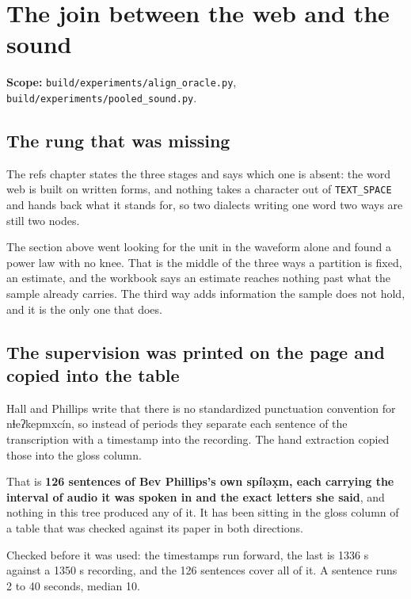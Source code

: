 \section{The join between the web and the sound}

\textbf{Scope:} \texttt{build/\allowbreak{}experiments/\allowbreak{}align\_\allowbreak{}oracle.\allowbreak{}py},
\texttt{build/\allowbreak{}experiments/\allowbreak{}pooled\_\allowbreak{}sound.\allowbreak{}py}.

\subsection{The rung that was missing}

The refs chapter states the three stages and says which one is absent: the word web is built on written
forms, and nothing takes a character out of \texttt{TEXT\_\allowbreak{}SPACE} and hands back what it
stands for, so two dialects writing one word two ways are still two nodes.

The section above went looking for the unit in the waveform alone and found a power law with no knee.
That is the middle of the three ways a partition is fixed, an estimate, and the workbook says an
estimate reaches nothing past what the sample already carries. The third way adds information the
sample does not hold, and it is the only one that does.

\subsection{The supervision was printed on the page and copied into the table}

Hall and Phillips write that there is no standardized punctuation convention for nɬeʔkepmxcín, so
instead of periods they separate each sentence of the transcription with a timestamp into the
recording. The hand extraction copied those into the gloss column.

That is \textbf{126 sentences of Bev Phillips's own spíləx̣m, each carrying the interval of audio it
was spoken in and the exact letters she said}, and nothing in this tree produced any of it. It has
been sitting in the gloss column of a table that was checked against its paper in both directions.

Checked before it was used: the timestamps run forward, the last is 1336 s against a 1350 s
recording, and the 126 sentences cover all of it. A sentence runs 2 to 40 seconds, median 10.

